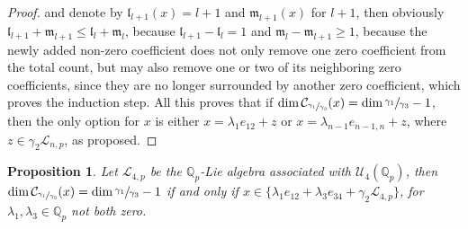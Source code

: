 \documentclass[12pt,fleqn]{article}
\newtheorem{proposition}[theorem]{Proposition}
\begin{document}
\begin{proof}
and denote by $\mathfrak{l}_{l+1}(x)=l+1$ and $\mathfrak{m}_{l+1}(x)$ for $l+1$, then obviously $\mathfrak{l}_{l+1}+\mathfrak{m}_{l+1}\leq\mathfrak{l}_l+\mathfrak{m}_l$, because $\mathfrak{l}_{l+1}-\mathfrak{l}_l=1$ and $\mathfrak{m}_{l}-\mathfrak{m}_{l+1}\geq 1$, because the newly added non-zero coefficient does not only remove one zero coefficient from the total count, but may also remove one or two of its neighboring zero coefficients, since they are no longer surrounded by another zero coefficient, which proves the induction step. All this proves that if $\dim\mathcal{C}_{\sfrac{\gamma_1}{\gamma_3}}(x)=\dim\sfrac{\gamma_1}{\gamma_3}-1$, then the only option for $x$ is either $x=\lambda_1 e_{12}+z$ or $x=\lambda_{n-1}e_{n-1,n}+z$, where $z\in\gamma_2\mathcal{L}_{n,p}$, as proposed.
\end{proof}
\begin{proposition}
\label{prop.n.geq.4.centralizer.codimension}
Let $\mathcal{L}_{4,p}$ be the $\mathbb{Q}_p$-Lie algebra associated with $\mathcal{U}_4(\mathbb{Q}_p)$, then $\dim\mathcal{C}_{\sfrac{\gamma_1}{\gamma_3}}(x)=\dim\sfrac{\gamma_1}{\gamma_3}-1$ if and only if $x\in\{\lambda_1 e_{12}+\lambda_3 e_{34}+\gamma_2\mathcal{L}_{4,p}\}$, for $\lambda_1,\lambda_3\in\mathbb{Q}_p$ not both zero.
\end{proposition}
\end{document}
